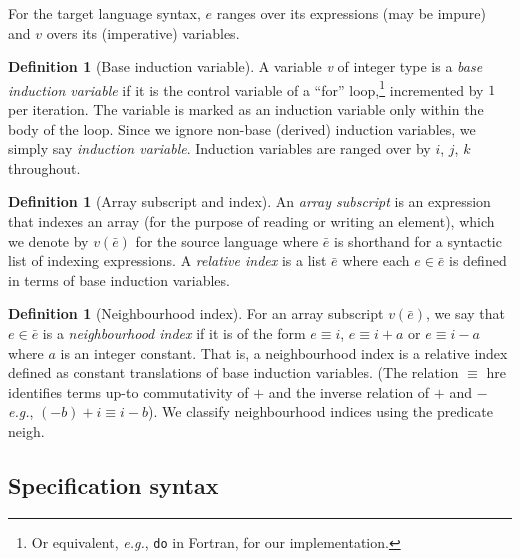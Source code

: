 \documentclass[9pt]{sigplanconf}
\newcounter{block}
\theoremstyle{definition}
\newtheorem{definition}[block]{Definition}
\newcommand{\eg}{\emph{e.g.}}
\newcommand{\neigh}{\textsf{neigh}}
\begin{document}
\renewcommand*{\arraystretch}{0.8}
For the target language
syntax, $e$ ranges over its expressions (may be impure) and $v$
overs its (imperative) variables. %

\begin{definition}[Base induction variable]
  A variable \textit{v} of integer type is a \emph{base induction
    variable} if it is the control variable of a ``for''
  loop,\footnote{Or equivalent, \eg{}, \texttt{do} in Fortran, for our implementation.} incremented by $1$ per
iteration. The variable is marked as an induction variable
only within the body of the loop. Since we ignore non-base
(derived) induction variables, we simply say \emph{induction
  variable}. Induction variables are ranged over by $i$, $j$, $k$ throughout. 
\end{definition}

\begin{definition}[Array subscript and index]
  An \emph{array subscript} is an expression that indexes an array
  (for the purpose of reading or writing an element), which we denote
  by $v(\bar{e})$ for the source language where $\bar{e}$ is shorthand
  for a syntactic list of indexing expressions. A \emph{relative
    index} is a list $\bar{e}$ where each $e \in \bar{e}$ is defined
  in terms of base induction variables.
\end{definition}

\begin{definition}[Neighbourhood index]
  For an array subscript $v(\bar{e})$, we say that $e \in \bar{e}$
  is a \emph{neighbourhood index} if it is of the form
  $e \equiv i$, $e \equiv i + a$ or $e \equiv i - a$ where $a$ is an
  integer constant. That is, a neighbourhood index is a
  relative index defined as constant translations of base induction
  variables. (The relation $\equiv$ hre identifies terms up-to commutativity
  of $+$ and the inverse relation of $+$ and $-$ \eg{},
  $(-b) + i \equiv i - b$).  We classify neighbourhood indices using
  the predicate \neigh{}. %
\label{def:neighbour}
\end{definition}


\subsection{Specification syntax}
\label{sec:syntax}
\end{document}
